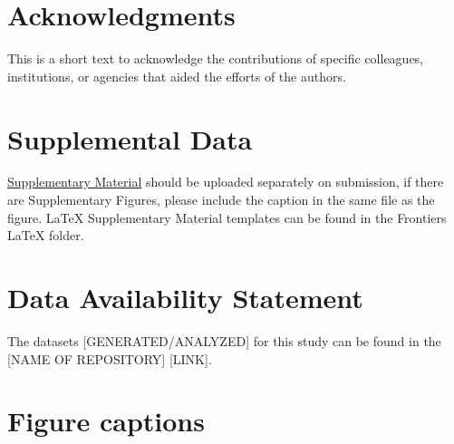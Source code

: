 \documentclass[utf8]{FrontiersinHarvard} %
\renewcommand*{\|}[1][]{\nonscript\:#1\vert\nonscript\:\mathopen{}}
\begin{document}
\section*{Acknowledgments}
This is a short text to acknowledge the contributions of specific colleagues, institutions, or agencies that aided the efforts of the authors.

\section*{Supplemental Data}
 \href{http://home.frontiersin.org/about/author-guidelines#SupplementaryMaterial}{Supplementary Material} should be uploaded separately on submission, if there are Supplementary Figures, please include the caption in the same file as the figure. LaTeX Supplementary Material templates can be found in the Frontiers LaTeX folder.

\section*{Data Availability Statement}
The datasets [GENERATED/ANALYZED] for this study can be found in the [NAME OF REPOSITORY] [LINK].




\section*{Figure captions}

\end{document}
